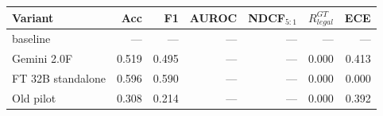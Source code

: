 \begin{tabular}{lrrrrrr}
\toprule
Variant & Acc & F1 & AUROC & NDCF$_{5:1}$ & $R_{legal}^{GT}$ & ECE \\
\midrule
baseline & — & — & — & — & — & — \\
Gemini 2.0F & 0.519 & 0.495 & — & — & 0.000 & 0.413 \\
FT 32B standalone & 0.596 & 0.590 & — & — & 0.000 & 0.000 \\
Old pilot & 0.308 & 0.214 & — & — & 0.000 & 0.392 \\
\bottomrule
\end{tabular}
